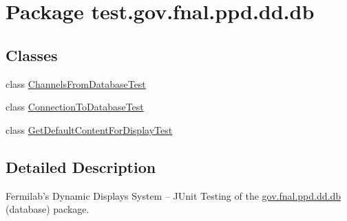 \hypertarget{namespacetest_1_1gov_1_1fnal_1_1ppd_1_1dd_1_1db}{\section{Package test.\-gov.\-fnal.\-ppd.\-dd.\-db}
\label{namespacetest_1_1gov_1_1fnal_1_1ppd_1_1dd_1_1db}
}
\subsection*{Classes}
\begin{DoxyCompactItemize}
\item 
class \hyperlink{classtest_1_1gov_1_1fnal_1_1ppd_1_1dd_1_1db_1_1ChannelsFromDatabaseTest}{Channels\-From\-Database\-Test}
\item 
class \hyperlink{classtest_1_1gov_1_1fnal_1_1ppd_1_1dd_1_1db_1_1ConnectionToDatabaseTest}{Connection\-To\-Database\-Test}
\item 
class \hyperlink{classtest_1_1gov_1_1fnal_1_1ppd_1_1dd_1_1db_1_1GetDefaultContentForDisplayTest}{Get\-Default\-Content\-For\-Display\-Test}
\end{DoxyCompactItemize}


\subsection{Detailed Description}
Fermilab's Dynamic Displays System -- J\-Unit Testing of the \hyperlink{namespacetest_1_1gov_1_1fnal_1_1ppd_1_1dd_1_1db}{gov.\-fnal.\-ppd.\-dd.\-db} (database) package.